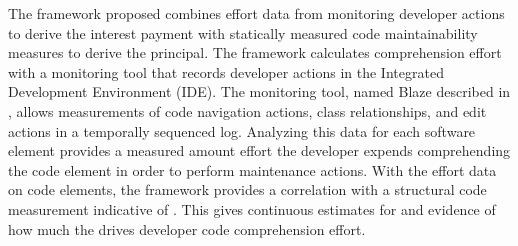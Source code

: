 The framework proposed combines effort data from monitoring developer actions to derive the interest payment with statically measured code maintainability measures to derive the principal.   The framework calculates comprehension effort with a monitoring tool that records developer actions in the Integrated Development Environment (IDE).  The monitoring tool, named Blaze described in \cite{Snipes2014Experiences}, allows measurements of code navigation actions, class relationships, and edit actions in a temporally sequenced log.  Analyzing this data for each software element provides a measured amount effort the developer expends comprehending the code element in order to perform maintenance actions. With the effort data on code elements, the framework provides a correlation with a structural code measurement indicative of \TD.  This gives continuous estimates for and evidence of how much the \TD drives developer code comprehension effort.

%
%
